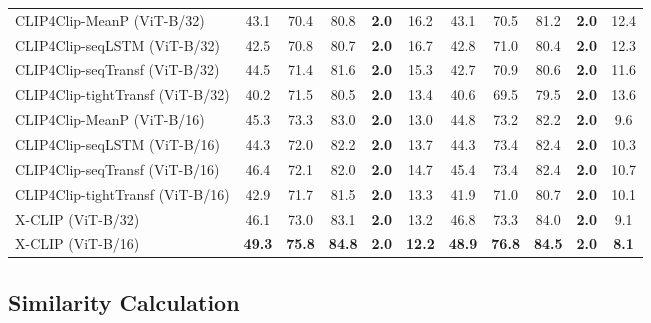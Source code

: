 \documentclass[sigconf]{acmart}
\begin{document}
\begin{table*}[]
\begin{tabular}{l|ccccc|ccccc}
CLIP4Clip-MeanP (ViT-B/32) \cite{luo2021clip4clip}  & 43.1          & 70.4          & 80.8          & \textbf{2.0} & 16.2          & 43.1          & 70.5          & 81.2          & \textbf{2.0} & 12.4          \\ 
CLIP4Clip-seqLSTM (ViT-B/32) \cite{luo2021clip4clip}  & 42.5          & 70.8          & 80.7          & \textbf{2.0} & 16.7          & 42.8          & 71.0          & 80.4          & \textbf{2.0} & 12.3          \\ 
CLIP4Clip-seqTransf (ViT-B/32) \cite{luo2021clip4clip}  & 44.5          & 71.4          & 81.6          & \textbf{2.0} & 15.3          & 42.7          & 70.9          & 80.6          & \textbf{2.0} & 11.6          \\ 
CLIP4Clip-tightTransf (ViT-B/32) \cite{luo2021clip4clip}  & 40.2          & 71.5          & 80.5          & \textbf{2.0} & 13.4          & 40.6          & 69.5          & 79.5          & \textbf{2.0} & 13.6          \\ 
CLIP4Clip-MeanP (ViT-B/16) \cite{luo2021clip4clip}  & 45.3 & 73.3 & 83.0 & \textbf{2.0} & 13.0 & 44.8 & 73.2 & 82.2 & \textbf{2.0} & 9.6  \\    
CLIP4Clip-seqLSTM (ViT-B/16) \cite{luo2021clip4clip}  & 44.3 & 72.0 & 82.2 & \textbf{2.0} & 13.7 & 44.3 & 73.4 & 82.4 & \textbf{2.0} & 10.3  \\   
CLIP4Clip-seqTransf (ViT-B/16) \cite{luo2021clip4clip}  & 46.4 & 72.1 & 82.0 & \textbf{2.0} & 14.7 & 45.4 & 73.4 & 82.4 & \textbf{2.0} & 10.7  \\  
CLIP4Clip-tightTransf (ViT-B/16) \cite{luo2021clip4clip}  & 42.9 & 71.7 & 81.5 & \textbf{2.0} & 13.3 & 41.9 & 71.0 & 80.7 & \textbf{2.0} & 10.1 
\\ \hline
X-CLIP (ViT-B/32)         & 46.1          & 73.0          & 83.1          & \textbf{2.0} & 13.2          & 46.8          & 73.3          & 84.0          & \textbf{2.0} & 9.1          \\
X-CLIP (ViT-B/16) & \textbf{49.3} & \textbf{75.8} & \textbf{84.8} & \textbf{2.0} & \textbf{12.2} & \textbf{48.9} & \textbf{76.8} & \textbf{84.5} & \textbf{2.0} & \textbf{8.1} \\ \hline
\end{tabular}
\label{tab:mstvtt_performance}
\end{table*}

\subsection{Similarity Calculation} \label{sec:similarity}
\end{document}

